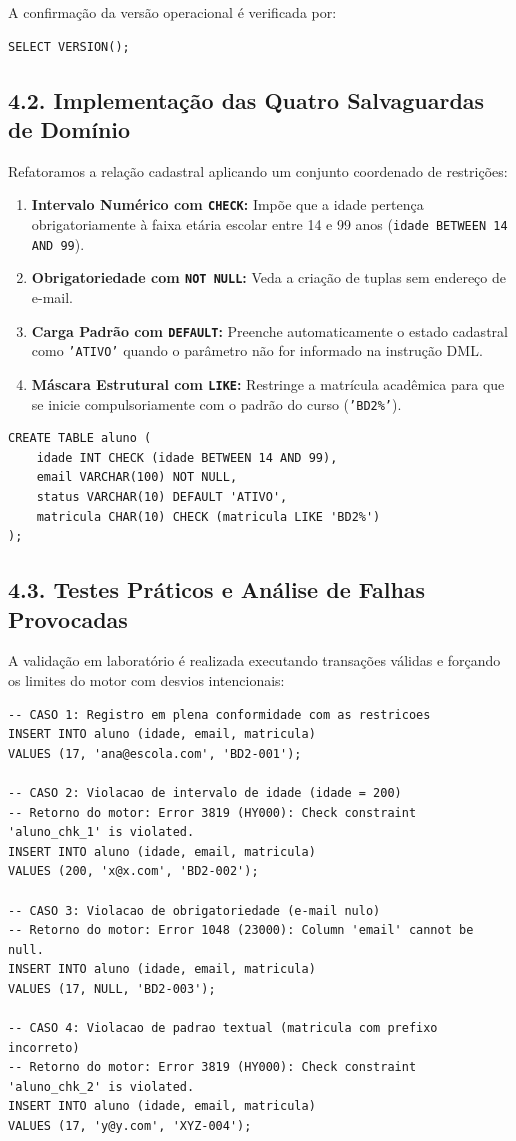 A confirmação da versão operacional é verificada por:
\begin{lstlisting}
SELECT VERSION();
\end{lstlisting}

\subsection*{4.2. Implementação das Quatro Salvaguardas de Domínio}

Refatoramos a relação cadastral aplicando um conjunto coordenado de restrições:
\begin{enumerate}
    \item \textbf{Intervalo Numérico com \texttt{CHECK}:} Impõe que a idade pertença obrigatoriamente à faixa etária escolar entre 14 e 99 anos (\texttt{idade BETWEEN 14 AND 99}).
    \item \textbf{Obrigatoriedade com \texttt{NOT NULL}:} Veda a criação de tuplas sem endereço de e-mail.
    \item \textbf{Carga Padrão com \texttt{DEFAULT}:} Preenche automaticamente o estado cadastral como \texttt{'ATIVO'} quando o parâmetro não for informado na instrução DML.
    \item \textbf{Máscara Estrutural com \texttt{LIKE}:} Restringe a matrícula acadêmica para que se inicie compulsoriamente com o padrão do curso (\texttt{'BD2\%'}).
\end{enumerate}

\begin{lstlisting}
CREATE TABLE aluno (
    idade INT CHECK (idade BETWEEN 14 AND 99),
    email VARCHAR(100) NOT NULL,
    status VARCHAR(10) DEFAULT 'ATIVO',
    matricula CHAR(10) CHECK (matricula LIKE 'BD2%')
);
\end{lstlisting}

\subsection*{4.3. Testes Práticos e Análise de Falhas Provocadas}

A validação em laboratório é realizada executando transações válidas e forçando os limites do motor com desvios intencionais:

\begin{lstlisting}
-- CASO 1: Registro em plena conformidade com as restricoes
INSERT INTO aluno (idade, email, matricula)
VALUES (17, 'ana@escola.com', 'BD2-001');

-- CASO 2: Violacao de intervalo de idade (idade = 200)
-- Retorno do motor: Error 3819 (HY000): Check constraint 'aluno_chk_1' is violated.
INSERT INTO aluno (idade, email, matricula)
VALUES (200, 'x@x.com', 'BD2-002');

-- CASO 3: Violacao de obrigatoriedade (e-mail nulo)
-- Retorno do motor: Error 1048 (23000): Column 'email' cannot be null.
INSERT INTO aluno (idade, email, matricula)
VALUES (17, NULL, 'BD2-003');

-- CASO 4: Violacao de padrao textual (matricula com prefixo incorreto)
-- Retorno do motor: Error 3819 (HY000): Check constraint 'aluno_chk_2' is violated.
INSERT INTO aluno (idade, email, matricula)
VALUES (17, 'y@y.com', 'XYZ-004');
\end{lstlisting}

